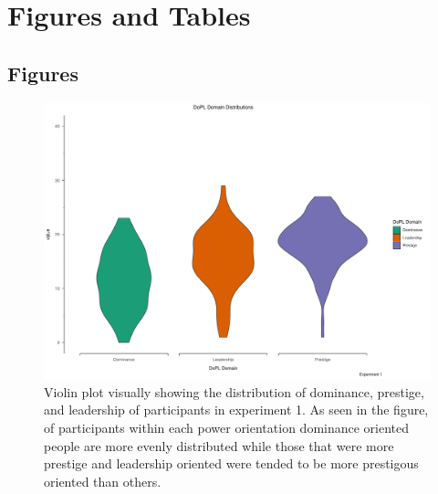 \documentclass[
  donotrepeattitle,doc, 12pt, a4paper,floatsintext]{apa7}
\begin{document}
\endgroup



\newpage

\hypertarget{figures-and-tables}{%
\section{Figures and Tables}\label{figures-and-tables}}

\hypertarget{figures}{%
\subsection{Figures}\label{figures}}

\begin{figure}
\centering
\includegraphics{Output_Files/DoPL-Experiment_files/figure-latex/DoPL-Experiment-1-1.pdf}
\caption{\label{fig:DoPL-Experiment-1}Violin plot visually showing the distribution of dominance, prestige, and leadership of participants in experiment 1. As seen in the figure, of participants within each power orientation dominance oriented people are more evenly distributed while those that were more prestige and leadership oriented were tended to be more prestigous oriented than others.}
\end{figure}
\end{document}
